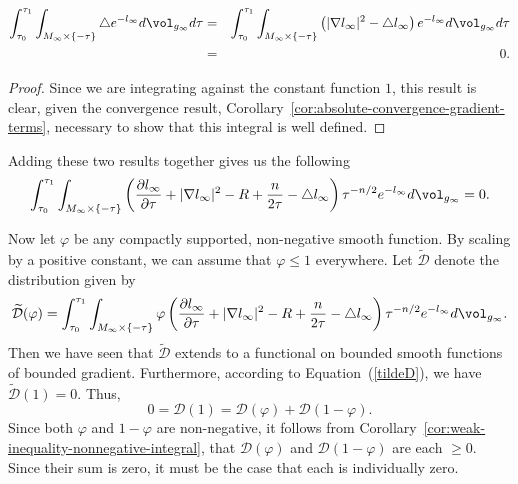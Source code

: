 \begin{claim}\label{claim:laplacian-integral-vanishes}
\begin{eqnarray*}
\int_{\tau_0}^{\tau_1}\int_{M_\infty\times\{-\tau\}}\triangle
e^{-l_\infty}d\vol_{g_\infty}d\tau & =
&\int_{\tau_0}^{\tau_1}\int_{M_\infty\times\{-\tau\}}\left(|\nabla
l_\infty|^2-\triangle l_\infty\right)e^{-l_\infty}d\vol_{g_\infty}d\tau \\
& = & 0.
\end{eqnarray*}
\end{claim}


\begin{proof}
Since we are integrating against the constant function $1$, this
result is clear, given the convergence result,
Corollary~\ref{cor:absolute-convergence-gradient-terms}, necessary to show that this integral is
well defined.
\end{proof}

Adding these two results together gives us the following
\begin{equation}\label{tildeD}
\int_{\tau_0}^{\tau_1}\int_{M_\infty\times\{-\tau\}}\left(\frac{\partial
l_\infty}{\partial \tau}+|\nabla l_\infty|^2
-R+\frac{n}{2\tau}-\triangle
l_\infty\right)\tau^{-n/2}e^{-l_\infty}d\vol_{g_\infty}=0.\end{equation}


Now let $\varphi$ be any compactly supported, non-negative smooth
function. By scaling by a positive constant, we can assume that
$\varphi\le 1$ everywhere. Let $\widetilde{\mathcal D}$ denote the
distribution given by
$$\widetilde{\mathcal D}(\varphi)=\int_{\tau_0}^{\tau_1}\int_{M_\infty\times\{-\tau\}}
\varphi\left(\frac{\partial l_\infty}{\partial \tau}+|\nabla
l_\infty|^2 -R+\frac{n}{2\tau}-\triangle
l_\infty\right)\tau^{-n/2}e^{-l_\infty}d\vol_{g_\infty}.$$ Then
we have seen that $\widetilde{\mathcal D}$ extends to a functional
on bounded smooth functions of bounded gradient. Furthermore,
according to Equation~(\ref{tildeD}), we have $\widetilde {\mathcal
D}(1)=0$. Thus,
$$0={\mathcal D}(1)={\mathcal D}(\varphi)+{\mathcal D}(1-\varphi).$$
Since both $\varphi$ and $1-\varphi$ are non-negative, it follows from
Corollary~\ref{cor:weak-inequality-nonnegative-integral}, that ${\mathcal D}(\varphi)$ and ${\mathcal
D}(1-\varphi)$ are each $\ge 0$. Since their sum is zero, it must be the case
that each is individually zero.

